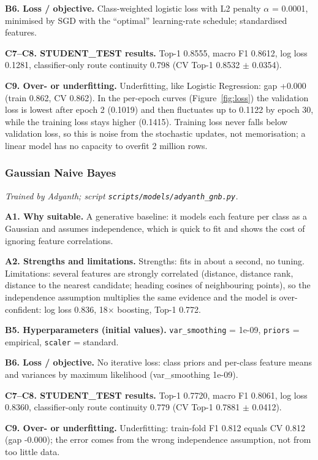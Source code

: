 \documentclass[11pt,a4paper]{article}
\begin{document}
\textbf{B6. Loss / objective.} Class-weighted logistic loss with L2 penalty $\alpha$ = 0.0001, minimised by SGD with the ``optimal'' learning-rate schedule; standardised features.

\textbf{C7--C8. STUDENT\_TEST results.} Top-1 0.8555, macro F1 0.8612, log loss 0.1281, classifier-only route continuity 0.798 (CV Top-1 0.8532 $\pm$ 0.0354).

\textbf{C9. Over- or underfitting.} Underfitting, like Logistic Regression: gap +0.000 (train 0.862, CV 0.862). In the per-epoch curves (Figure~\ref{fig:loss}) the validation loss is lowest after epoch 2 (0.1019) and then fluctuates up to 0.1122 by epoch 30, while the training loss stays higher (0.1415). Training loss never falls below validation loss, so this is noise from the stochastic updates, not memorisation; a linear model has no capacity to overfit 2 million rows.
\subsubsection{Gaussian Naive Bayes}
\textit{Trained by Adyanth; script \texttt{scripts/models/adyanth\_gnb.py}.}

\textbf{A1. Why suitable.} A generative baseline: it models each feature per class as a Gaussian and assumes independence, which is quick to fit and shows the cost of ignoring feature correlations.

\textbf{A2. Strengths and limitations.} Strengths: fits in about a second, no tuning. Limitations: several features are strongly correlated (distance, distance rank, distance to the nearest candidate; heading cosines of neighbouring points), so the independence assumption multiplies the same evidence and the model is over-confident: log loss 0.836, 18$\times$ boosting, Top-1 0.772.

\textbf{B5. Hyperparameters (initial values).} \texttt{var\_smoothing} = 1e-09, \texttt{priors} = empirical, \texttt{scaler} = standard.

\textbf{B6. Loss / objective.} No iterative loss: class priors and per-class feature means and variances by maximum likelihood (var\_smoothing 1e-09).

\textbf{C7--C8. STUDENT\_TEST results.} Top-1 0.7720, macro F1 0.8061, log loss 0.8360, classifier-only route continuity 0.779 (CV Top-1 0.7881 $\pm$ 0.0412).

\textbf{C9. Over- or underfitting.} Underfitting: train-fold F1 0.812 equals CV 0.812 (gap -0.000); the error comes from the wrong independence assumption, not from too little data.
\end{document}
